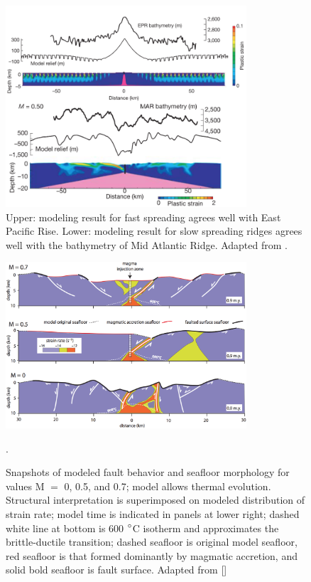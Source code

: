 \begin{figure}[h]
 \centering
  \includegraphics[width=0.8\textwidth]{./Figures/fig_Intro5_1.png}
 \caption[2D model results adapted from \citep{Buck2005}.]{Upper: modeling result for fast spreading agrees well with East Pacific Rise. Lower: modeling result for slow spreading ridges agrees well with the bathymetry of Mid Atlantic Ridge. Adapted from \citep{Buck2005}.}
 \label{fig_Intro5_1}
\end{figure}

\begin{figure}[h]
 \centering
  \includegraphics[width=0.8\textwidth]{./Figures/fig_Intro_Tucholke2008.eps}
 \caption[2D model results adapted from \citep{Tucholke2008,Whitney2012}.]{Snapshots of modeled fault behavior and seafloor morphology for values M $=$ 0, 0.5, and 0.7; model allows thermal evolution. Structural interpretation is superimposed on modeled distribution of strain rate; model time is indicated in panels at lower right; dashed white line at bottom is 600 $\degree$C isotherm and approximates the brittle-ductile transition; dashed seafloor is original model seafloor, red seafloor is that formed dominantly by magmatic accretion, and solid bold seafloor is fault surface. Adapted from [\citealp{Tucholke2008,Whitney2012}]}.
 \label{fig_Intro6_1}
\end{figure}

